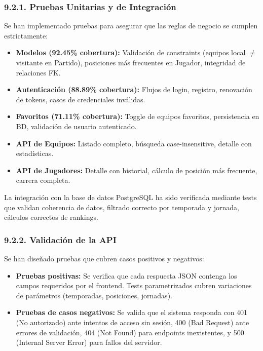 \subsubsection{9.2.1. Pruebas Unitarias y de Integración}

Se han implementado pruebas para asegurar que las reglas de negocio 
se cumplen estrictamente:

\begin{itemize}
  \item \textbf{Modelos (92.45\% cobertura):} Validación de 
        constraints (equipos local $\neq$ visitante en Partido), 
        posiciones más frecuentes en Jugador, integridad de 
        relaciones FK.
  
  \item \textbf{Autenticación (88.89\% cobertura):} Flujos de 
        login, registro, renovación de tokens, casos de 
        credenciales inválidas.
  
  \item \textbf{Favoritos (71.11\% cobertura):} Toggle de equipos 
        favoritos, persistencia en BD, validación de usuario 
        autenticado.
  
  \item \textbf{API de Equipos:} Listado completo, búsqueda 
        case-insensitive, detalle con estadísticas.
  
  \item \textbf{API de Jugadores:} Detalle con historial, cálculo 
        de posición más frecuente, carrera completa.
\end{itemize}

La integración con la base de datos PostgreSQL ha sido verificada 
mediante tests que validan coherencia de datos, filtrado correcto 
por temporada y jornada, cálculos correctos de rankings.


\subsubsection{9.2.2. Validación de la API}

Se han diseñado pruebas que cubren casos positivos y negativos:

\begin{itemize}
  \item \textbf{Pruebas positivas:} Se verifica que cada respuesta 
        JSON contenga los campos requeridos por el frontend. Tests 
        parametrizados cubren variaciones de parámetros (temporadas, 
        posiciones, jornadas).
  
  \item \textbf{Pruebas de casos negativos:} Se valida que el 
        sistema responda con 401 (No autorizado) ante intentos de 
        acceso sin sesión, 400 (Bad Request) ante errores de 
        validación, 404 (Not Found) para endpoints inexistentes, y 
        500 (Internal Server Error) para fallos del servidor.
\end{itemize}



